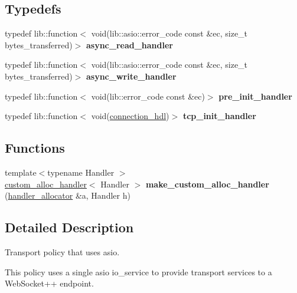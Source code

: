 \subsection*{Typedefs}
\begin{DoxyCompactItemize}
\item 
\mbox{\label{namespacewebsocketpp_1_1transport_1_1asio_ac221bb77099f7ba684d4c39545d01116}} 
typedef lib\+::function$<$ void(lib\+::asio\+::error\+\_\+code const \&ec, size\+\_\+t bytes\+\_\+transferred)$>$ {\bfseries async\+\_\+read\+\_\+handler}
\item 
\mbox{\label{namespacewebsocketpp_1_1transport_1_1asio_a989b4423e174cb815d9ea9f87910b287}} 
typedef lib\+::function$<$ void(lib\+::asio\+::error\+\_\+code const \&ec, size\+\_\+t bytes\+\_\+transferred)$>$ {\bfseries async\+\_\+write\+\_\+handler}
\item 
\mbox{\label{namespacewebsocketpp_1_1transport_1_1asio_ad084554aff8b16e5c5d9a51ef82939cf}} 
typedef lib\+::function$<$ void(lib\+::error\+\_\+code const \&ec)$>$ {\bfseries pre\+\_\+init\+\_\+handler}
\item 
\mbox{\label{namespacewebsocketpp_1_1transport_1_1asio_ad12345b8638872037c87db068467233d}} 
typedef lib\+::function$<$ void(\mbox{\hyperlink{namespacewebsocketpp_a6b3d26a10ee7229b84b776786332631d}{connection\+\_\+hdl}})$>$ {\bfseries tcp\+\_\+init\+\_\+handler}
\end{DoxyCompactItemize}
\subsection*{Functions}
\begin{DoxyCompactItemize}
\item 
\mbox{\label{namespacewebsocketpp_1_1transport_1_1asio_a2ff04709483387d7b8c542dd7575f885}} 
{\footnotesize template$<$typename Handler $>$ }\\\mbox{\hyperlink{classwebsocketpp_1_1transport_1_1asio_1_1custom__alloc__handler}{custom\+\_\+alloc\+\_\+handler}}$<$ Handler $>$ {\bfseries make\+\_\+custom\+\_\+alloc\+\_\+handler} (\mbox{\hyperlink{classwebsocketpp_1_1transport_1_1asio_1_1handler__allocator}{handler\+\_\+allocator}} \&a, Handler h)
\end{DoxyCompactItemize}


\subsection{Detailed Description}
Transport policy that uses asio. 

This policy uses a single asio io\+\_\+service to provide transport services to a Web\+Socket++ endpoint. 